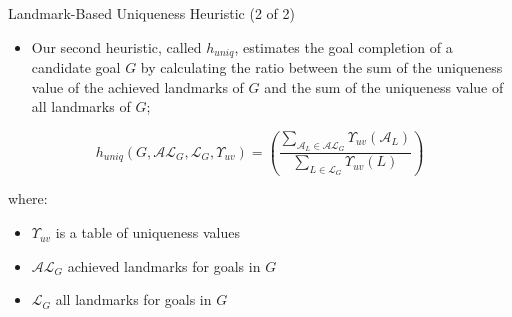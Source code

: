 \documentclass{beamer}
\begin{document}
	\begin{frame}{Landmark-Based Uniqueness Heuristic (2 of 2)}
		
		\begin{itemize}
			\item Our second heuristic, called $h_{uniq}$, estimates the goal completion of a candidate goal $G$ by calculating the ratio between the sum of the uniqueness value of the achieved landmarks of $G$ and the sum of the uniqueness value of all landmarks of $G$;
		\end{itemize}
		
		\begin{equation}
		h_{\mathit{uniq}}(G, \mathcal{AL}_{G}, \mathcal{L}_{G}, \Upsilon_{uv}) = \left(
		\frac
		{\displaystyle\sum_{\mathcal{A}_{L} \in \mathcal{AL}_{G}}\Upsilon_{uv}(\mathcal{A}_{L})}
		{\displaystyle\sum_{L \in \mathcal{L}_{G}}\Upsilon_{uv}(L)}\right)
		\end{equation}	
		
		where:
		\begin{itemize}
			\item $\Upsilon_{uv}$ is a table of uniqueness values
			\item $\mathcal{AL}_{G}$ achieved landmarks for goals in $G$
			\item $\mathcal{L}_{G}$ all landmarks for goals in $G$
		\end{itemize}
		
	\end{frame}
		
\end{document}
